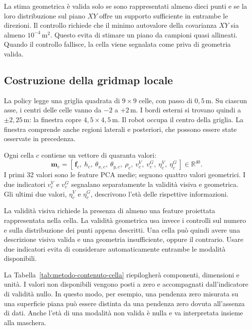 La stima geometrica è valida solo se sono rappresentati almeno dieci punti e se la loro distribuzione sul piano $XY$ offre un supporto sufficiente in entrambe le direzioni. Il controllo richiede che il minimo autovalore della covarianza $XY$ sia almeno $10^{-4}\,\mathrm{m}^2$. Questo evita di stimare un piano da campioni quasi allineati. Quando il controllo fallisce, la cella viene segnalata come priva di geometria valida.

\subsection{Costruzione della gridmap locale}

La policy legge una griglia quadrata di $9\times9$ celle, con passo di $0{,}5\,\mathrm{m}$. Su ciascun asse, i centri delle celle vanno da $-2$ a $+2\,\mathrm{m}$. I bordi esterni si trovano quindi a $\pm2{,}25\,\mathrm{m}$: la finestra copre $4{,}5\times4{,}5\,\mathrm{m}$. Il robot occupa il centro della griglia. La finestra comprende anche regioni laterali e posteriori, che possono essere state osservate in precedenza.

Ogni cella $c$ contiene un vettore di quaranta valori:
\begin{equation}
    \mathbf m_c=
    [\,\mathbf f_c,\ h_c,\ \theta_{x,c},\ \theta_{y,c},\ \rho_c,
        \ v_c^V,\ v_c^G,\ \eta_c^V,\ \eta_c^G\,]
        \in\mathbb R^{40}.
    \label{eq:metodo-vettore-cella}
\end{equation}
I primi 32 valori sono le feature PCA medie; seguono quattro valori geometrici. I due indicatori $v_c^V$ e $v_c^G$ segnalano separatamente la validità visiva e geometrica. Gli ultimi due valori, $\eta_c^V$ e $\eta_c^G$, descrivono l'età delle rispettive informazioni.

La validità visiva richiede la presenza di almeno una feature proiettata rappresentata nella cella. La validità geometrica usa invece i controlli sul numero e sulla distribuzione dei punti appena descritti. Una cella può quindi avere una descrizione visiva valida e una geometria insufficiente, oppure il contrario. Usare due indicatori evita di considerare automaticamente entrambe le modalità disponibili.

La Tabella~\ref{tab:metodo-contenuto-cella} riepilogherà componenti, dimensioni e unità. I valori non disponibili vengono posti a zero e accompagnati dall'indicatore di validità nullo. In questo modo, per esempio, una pendenza zero misurata su una superficie piana può essere distinta da una pendenza zero dovuta all'assenza di dati. Anche l'età di una modalità non valida è nulla e va interpretata insieme alla maschera.

